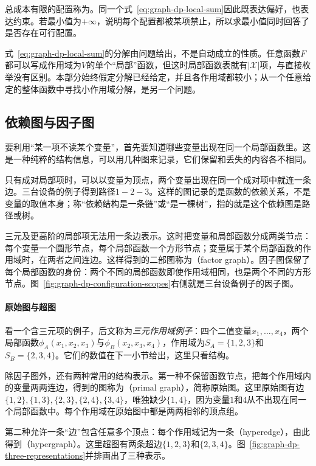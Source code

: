 总成本有限的配置称为。同一个式~\eqref{eq:graph-dp-local-sum}因此既表达偏好，也表达约束。若最小值为$+\infty$，说明每个配置都被某项禁止，所以求最小值同时回答了是否存在可行配置。

式~\eqref{eq:graph-dp-local-sum}的分解由问题给出，不是自动成立的性质。任意函数$F$都可以写成作用域为$V$的单个“局部”函数，但这时局部函数表就有$|\mathcal X|$项，与直接枚举没有区别。本部分始终假定分解已经给定，并且各作用域都较小；从一个任意给定的整体函数中寻找小作用域分解，是另一个问题。

\subsection{依赖图与因子图}
\label{sec:graph-dp-factor-graphs}

要利用“某一项不读某个变量”，首先要知道哪些变量出现在同一个局部函数里。这是一种纯粹的结构信息，可以用几种图来记录，它们保留和丢失的内容各不相同。

只有成对局部项时，可以以变量为顶点，两个变量出现在同一个成对项中就连一条边。三台设备的例子得到路径$1-2-3$。这样的图记录的是函数的依赖关系，不是变量的取值本身；称“依赖结构是一条链”或“是一棵树”，指的就是这个依赖图是路径或树。

三元及更高阶的局部项无法用一条边表示。这时把变量和局部函数分成两类节点：每个变量一个圆形节点，每个局部函数一个方形节点；变量属于某个局部函数的作用域时，在两者之间连边。这样得到的二部图称为（factor graph）。因子图保留了每个局部函数的身份：两个不同的局部函数即使作用域相同，也是两个不同的方形节点。图~\ref{fig:graph-dp-configuration-scopes}右侧就是三台设备例子的因子图。

\paragraph{原始图与超图}
看一个含三元项的例子，后文称为\emph{三元作用域例子}：四个二值变量$x_1,\ldots,x_4$，两个局部函数$\phi_A(x_1,x_2,x_3)$与$\phi_B(x_2,x_3,x_4)$，作用域为$S_A=\{1,2,3\}$和$S_B=\{2,3,4\}$。它们的数值在下一小节给出，这里只看结构。

除因子图外，还有两种常用的结构表示。第一种不保留函数节点，把每个作用域内的变量两两连边，得到的图称为（primal graph），简称原始图。这里原始图有边$\{1,2\},\allowbreak\{1,3\},\allowbreak\{2,3\},\allowbreak\{2,4\},\allowbreak\{3,4\}$，唯独缺少$\{1,4\}$，因为变量$1$和$4$从不出现在同一个局部函数中。每个作用域在原始图中都是两两相邻的顶点组。

第二种允许一条“边”包含任意多个顶点：每个作用域记为一条（hyperedge），由此得到（hypergraph）。这里超图有两条超边$\{1,2,3\}$和$\{2,3,4\}$。图~\ref{fig:graph-dp-three-representations}并排画出了三种表示。


